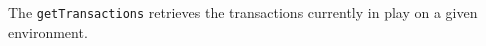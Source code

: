 The \verb+getTransactions+ retrieves the transactions currently in play on a given \Rapture environment.
